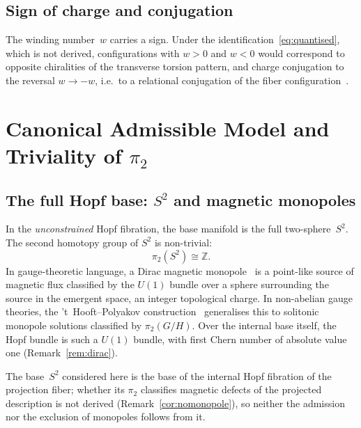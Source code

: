 \documentclass[11pt,a4paper]{article}
\begin{document}
    \subsection{Sign of charge and conjugation}

      The winding number~$w$ carries a sign.
      Under the identification~\eqref{eq:quantised}, which is not derived,
      configurations with $w > 0$ and $w < 0$ would correspond to opposite
      chiralities of the transverse torsion pattern, and
      charge conjugation to the reversal $w \to -w$,
      i.e.\ to a relational conjugation of the fiber
      configuration~\cite{Cosmochrony}.

  \section{Canonical Admissible Model and Triviality of $\pi_2$}
    \label{sec:canonical}

    \subsection{The full Hopf base: $S^2$ and magnetic monopoles}

      In the \emph{unconstrained} Hopf fibration, the base manifold is the
      full two-sphere~$S^2$.
      The second homotopy group of $S^2$ is non-trivial:
      \begin{equation}
        \label{eq:pi2S2}
        \pi_2(S^2) \cong \mathbb{Z}.
      \end{equation}
      In gauge-theoretic language, a Dirac magnetic
      monopole~\cite{Dirac1931} is a point-like source of magnetic flux
      classified by the $U(1)$ bundle over a sphere surrounding the source
      in the emergent space, an integer topological charge.
      In non-abelian gauge theories, the 't~Hooft--Polyakov
      construction~\cite{tHooft1974,Polyakov1974} generalises this to
      solitonic monopole solutions classified by $\pi_2(G/H)$.
      Over the internal base itself, the Hopf bundle is such a $U(1)$ bundle,
      with first Chern number of absolute value one
      (Remark~\ref{rem:dirac}).

      The base~$S^2$ considered here is the base of the internal Hopf
      fibration of the projection fiber; whether its $\pi_2$ classifies
      magnetic defects of the projected description is not derived
      (Remark~\ref{cor:nomonopole}), so neither the admission nor the
      exclusion of monopoles follows from it.
\end{document}
